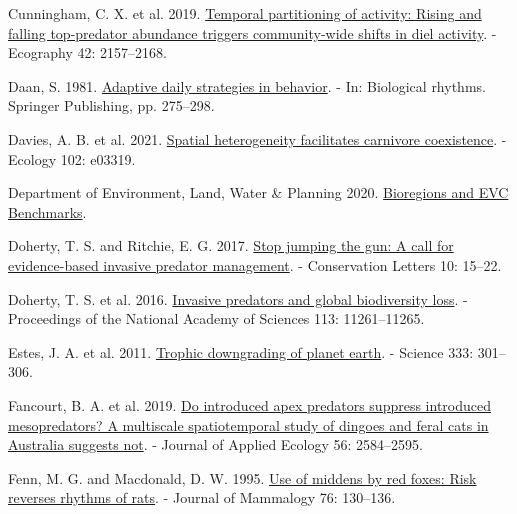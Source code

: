 \documentclass[preprint, 3p, authoryear]{elsarticle} %
\newlength{\cslhangindent}
\newlength{\cslentryspacingunit} %
\newenvironment{CSLReferences}[2] %
 {%
  \setlength{\parindent}{0pt}
  \ifodd #1
  \let\oldpar\par
  \def\par{\hangindent=\cslhangindent\oldpar}
  \fi
  \setlength{\parskip}{#2\cslentryspacingunit}
 }%
 {}
\begin{document}
\begin{CSLReferences}{1}{0}
\leavevmode{}%
Cunningham, C. X. et al. 2019. \href{https://doi.org/10.1111/ecog.04485}{Temporal partitioning of activity: Rising and falling top-predator abundance triggers community-wide shifts in diel activity}. - Ecography 42: 2157--2168.

\leavevmode{}%
Daan, S. 1981. \href{https://doi.org/10.1007/978-1-4615-6552-9_15}{Adaptive daily strategies in behavior}. - In: Biological rhythms. Springer Publishing, pp. 275--298.

\leavevmode{}%
Davies, A. B. et al. 2021. \href{https://doi.org/10.1002/ecy.3319}{Spatial heterogeneity facilitates carnivore coexistence}. - Ecology 102: e03319.

\leavevmode{}%
Department of Environment, Land, Water \& Planning 2020. \href{https://www.environment.vic.gov.au/biodiversity/bioregions-and-evc-benchmarks}{{Bioregions and EVC Benchmarks}}.

\leavevmode{}%
Doherty, T. S. and Ritchie, E. G. 2017. \href{https://doi.org/10.1111/conl.12251}{Stop jumping the gun: A call for evidence-based invasive predator management}. - Conservation Letters 10: 15--22.

\leavevmode{}%
Doherty, T. S. et al. 2016. \href{https://doi.org/10.1073/pnas.1602480113}{Invasive predators and global biodiversity loss}. - Proceedings of the National Academy of Sciences 113: 11261--11265.

\leavevmode{}%
Estes, J. A. et al. 2011. \href{https://doi.org/10.1126/science.1205106}{Trophic downgrading of planet earth}. - Science 333: 301--306.

\leavevmode{}%
Fancourt, B. A. et al. 2019. \href{https://doi.org/10.1111/1365-2664.13514}{Do introduced apex predators suppress introduced mesopredators? A multiscale spatiotemporal study of dingoes and feral cats in {A}ustralia suggests not}. - Journal of Applied Ecology 56: 2584--2595.

\leavevmode{}%
Fenn, M. G. and Macdonald, D. W. 1995. \href{https://doi.org/10.2307/1382321}{Use of middens by red foxes: Risk reverses rhythms of rats}. - Journal of Mammalogy 76: 130--136.


\end{CSLReferences}
\end{document}
